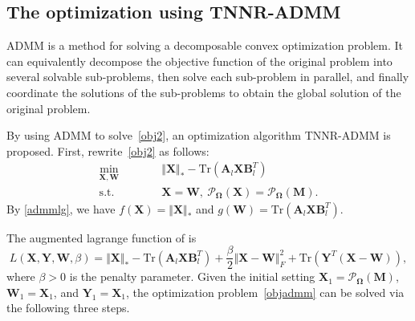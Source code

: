 \documentclass[fontset=windows]{article}
\begin{document}
{\subsection{The optimization using TNNR-ADMM}
ADMM is a method for solving a decomposable convex optimization problem. It can equivalently decompose the objective function of the original problem into several solvable sub-problems, then solve each sub-problem in parallel, and finally coordinate the solutions of the sub-problems to obtain the global solution of the original problem.

By using ADMM to solve~\eqref{obj2}, an optimization algorithm TNNR-ADMM is proposed. First, rewrite~\eqref{obj2} as follows:
\begin{equation}
    \begin{aligned}
        \underset{\mathbf X,\mathbf W}{\min}\qquad&\quad \Vert\mathbf X \Vert_* - \text{Tr}(\mathbf A_l\mathbf X\mathbf B_l^T) \\
        \text{s.t.}\qquad&\quad \mathbf X=\mathbf W, \ \mathcal{P}_{\mathbf\Omega}(\mathbf X) =  \mathcal{P}_{\mathbf\Omega}(\mathbf M).
    \end{aligned}\label{objadmm}
\end{equation}
By \eqref{admmlg}, we have $f(\mathbf X)=\Vert\mathbf X \Vert_*$ and $g(\mathbf W) = \text{Tr}(\mathbf A_l\mathbf X\mathbf B_l^T)$. 

The augmented lagrange function of is 
\begin{equation}
    L(\mathbf X,\mathbf Y,\mathbf W,\beta) = \Vert\mathbf X \Vert_* - \text{Tr}(\mathbf A_l\mathbf X\mathbf B_l^T) + \frac{\beta}{2}\Vert\mathbf X-\mathbf W \Vert_F^2 + \text{Tr}(\mathbf Y^T(\mathbf X-\mathbf W)),
\end{equation}
where $\beta > 0$ is  the penalty parameter. Given the initial setting $\mathbf X_1 = \mathcal{P}_{\mathbf\Omega}(\mathbf M)$, $\mathbf W_1 =\mathbf X_1$, and $\mathbf Y_1 =\mathbf X_1$, the optimization problem~\eqref{objadmm} can be solved via the following three steps.

}
\end{document}
